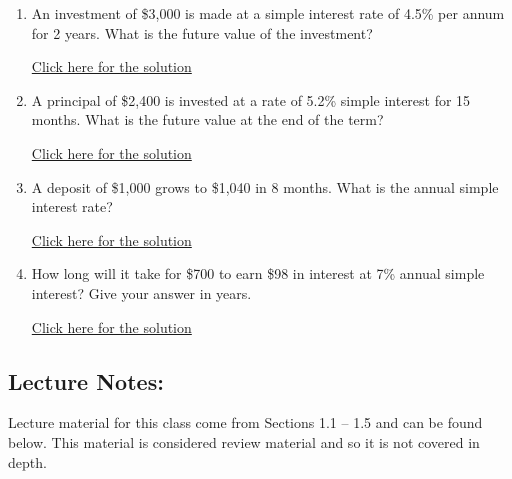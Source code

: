 \documentclass[
]{book}
\providecommand{\tightlist}{%
  \setlength{\itemsep}{0pt}\setlength{\parskip}{0pt}}
\begin{document}
\begin{enumerate}
\def\labelenumi{\arabic{enumi}.}
\tightlist
\item
  An investment of \$3,000 is made at a simple interest rate of 4.5\% per annum for 2 years. What is the future value of the investment?

  \href{https://youtu.be/7qmcWXW8fos}{Click here for the solution}
\item
  A principal of \$2,400 is invested at a rate of 5.2\% simple interest for 15 months. What is the future value at the end of the term?

  \href{https://youtu.be/OxLt9Az2QA8}{Click here for the solution}
\item
  A deposit of \$1,000 grows to \$1,040 in 8 months. What is the annual simple interest rate?

  \href{hhttps://youtu.be/D1t4ZLWUpVI}{Click here for the solution}
\item
  How long will it take for \$700 to earn \$98 in interest at 7\% annual simple interest? Give your answer in years.

  \href{https://youtu.be/inwp5jWlTSo}{Click here for the solution}
\end{enumerate}

\subsection*{Lecture Notes:}\label{lecture-notes-8}

Lecture material for this class come from Sections 1.1 -- 1.5 and can be found below. This material is considered review material and so it is not covered in depth.
\end{document}
